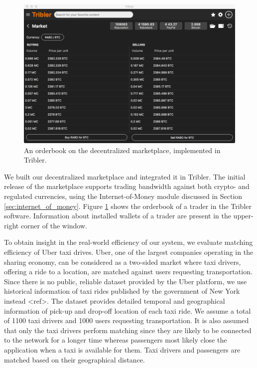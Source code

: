 \documentclass[USenglish]{article}
\begin{document}
\begin{figure}[t]
	\centering
	\includegraphics[width=.9\columnwidth]{assets/tribler_market}
	\caption{An orderbook on the decentralized marketplace, implemented in Tribler.}
	\label{fig:tribler_market}
\end{figure}

We built our decentralized marketplace and integrated it in Tribler.
The initial release of the marketplace supports trading bandwidth against both crypto- and regulated currencies, using the Internet-of-Money module discussed in Section \ref{sec:internet_of_money}.
Figure \ref{fig:tribler_market} shows the orderbook of a trader in the Tribler software.
Information about installed wallets of a trader are present in the upper-right corner of the window.

To obtain insight in the real-world efficiency of our system, we evaluate matching efficiency of Uber taxi drives.
Uber, one of the largest companies operating in the sharing economy, can be considered as a two-sided market where taxi drivers, offering a ride to a location, are matched against users requesting transportation.
Since there is no public, reliable dataset provided by the Uber platform, we use historical information of taxi rides published by the government of New York instead <ref>.
The dataset provides detailed temporal and geographical information of pick-up and drop-off location of each taxi ride.
We assume a total of 1100 taxi drivers and 1000 users requesting transportation.
It is also assumed that only the taxi drivers perform matching since they are likely to be connected to the network for a longer time whereas passengers most likely close the application when a taxi is available for them.
Taxi drivers and passengers are matched based on their geographical distance.
\end{document}
